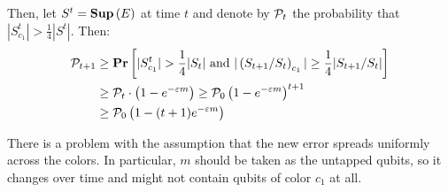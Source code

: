 \documentclass[manuscript,screen,review]{acmart}
\begin{document}
Then, let $S^{t} = \mathbf{Sup} \left(E\right) $ at time $t$ and denote by $\mathcal{P}_{t}$ the probability that $|S^{t}_{c_{1}}| > \frac{1}{4}|S^{t}|$. Then:
\begin{equation*}
  \begin{split}
    \mathcal{P}_{t+1} &\ge \mathbf{Pr} \left[  |S^{t}_{c_{1}}| > \frac{1}{4}|S_{t}| \text{ and }  | \left( S_{t+1}/S_{t} \right)_{c_1}  | \ge \frac{1}{4}|S_{t+1}/S_{t}|   \right]  \\
    &\ge \mathcal{P}_{t} \cdot \left( 1 - e^{- \varepsilon m}   \right) \ge \mathcal{P}_{0}\left( 1 - e^{- \varepsilon m } \right)^{t+1} \\ 
    & \ge \mathcal{P}_{0}\left( 1 - (t+1) e^{- \varepsilon m } \right)
  \end{split}
\end{equation*}

There is a problem with the assumption that the new error spreads uniformly across the colors. In particular, $m$ should be taken as the untapped qubits, so it changes over time and might not contain qubits of color $c_{1}$ at all.
\end{document}
